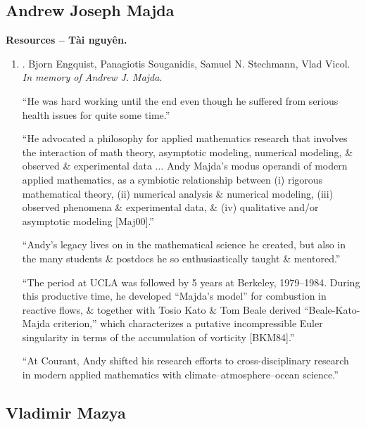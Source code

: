 \documentclass{article}
\begin{document}

\subsection{Andrew Joseph Majda}
\textbf{\textsf{Resources -- Tài nguyên.}}
\begin{enumerate}
	\item \cite{memory_Andrew_Joseph_Majda}. {\sc Bjorn Engquist, Panagiotis Souganidis, Samuel N. Stechmann, Vlad Vicol}. {\it In memory of Andrew J. Majda}.
	
	``He was hard working until the end even though he suffered from serious health issues for quite some time.''
	
	``He advocated a philosophy for applied mathematics research that involves the interaction of math theory, asymptotic modeling, numerical modeling, \& observed \& experimental data $\ldots$ Andy Majda's modus operandi of modern applied mathematics, as a symbiotic relationship between (i) rigorous mathematical theory, (ii) numerical analysis \& numerical modeling, (iii) observed phenomena \& experimental data, \& (iv) qualitative and/or asymptotic modeling [Maj00].''
	
	``Andy's legacy lives on in the mathematical science he created, but also in the many students \& postdocs he so enthusiastically taught \& mentored.''
	
	``The period at UCLA was followed by 5 years at Berkeley, 1979--1984. During this productive time, he developed ``Majda's model'' for combustion in reactive flows, \& together with Tosio Kato \& Tom Beale derived ``Beale-Kato-Majda criterion,'' which characterizes a putative incompressible Euler singularity in terms of the accumulation of vorticity [BKM84].''
	
	``At Courant, Andy shifted his research efforts to cross-disciplinary research in modern applied mathematics with climate--atmosphere--ocean science.''
\end{enumerate}


\subsection{Vladimir Mazya}


\end{document}
